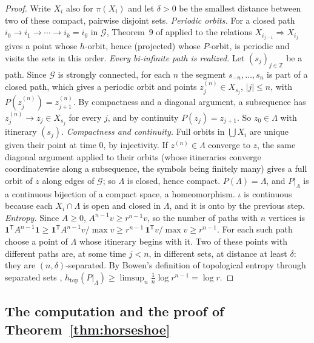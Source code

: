 \documentclass[11pt]{article}
\theoremstyle{definition}
\newcommand{\Z}{\mathbb{Z}}
\newcommand{\htop}{h_{\mathrm{top}}}
\begin{document}
\begin{proof}
Write $X_i$ also for $\pi(X_i)$ and let $\delta > 0$ be the smallest distance between two of these compact, pairwise disjoint sets. \emph{Periodic orbits.} For a closed path $i_0 \to i_1 \to \cdots \to i_k = i_0$ in $\mathcal G$, Theorem~9 of \cite{zg2004} applied to the relations $X_{i_{j-1}} \Rightarrow X_{i_j}$ gives a point whose $h$-orbit, hence (projected) whose $P$-orbit, is periodic and visits the sets in this order. \emph{Every bi-infinite path is realized.} Let $(s_j)_{j \in \Z}$ be a path. Since $\mathcal G$ is strongly connected, for each $n$ the segment $s_{-n}, \ldots, s_n$ is part of a closed path, which gives a periodic orbit and points $z^{(n)}_j \in X_{s_j}$, $|j| \le n$, with $P(z^{(n)}_j) = z^{(n)}_{j+1}$. By compactness and a diagonal argument, a subsequence has $z^{(n)}_j \to z_j \in X_{s_j}$ for every $j$, and by continuity $P(z_j) = z_{j+1}$. So $z_0 \in \Lambda$ with itinerary $(s_j)$. \emph{Compactness and continuity.} Full orbits in $\bigcup X_i$ are unique given their point at time $0$, by injectivity. If $z^{(n)} \in \Lambda$ converge to $z$, the same diagonal argument applied to their orbits (whose itineraries converge coordinatewise along a subsequence, the symbols being finitely many) gives a full orbit of $z$ along edges of $\mathcal G$; so $\Lambda$ is closed, hence compact. $P(\Lambda) = \Lambda$, and $P|_\Lambda$ is a continuous bijection of a compact space, a homeomorphism. $\iota$ is continuous because each $X_i \cap \Lambda$ is open and closed in $\Lambda$, and it is onto by the previous step. \emph{Entropy.} Since $A \ge 0$, $A^{n-1}v \ge r^{n-1}v$, so the number of paths with $n$ vertices is $\mathbf 1^{\mathsf T}A^{n-1}\mathbf 1 \ge \mathbf 1^{\mathsf T}A^{n-1}v/\max v \ge r^{n-1}\,\mathbf 1^{\mathsf T}v/\max v \ge r^{n-1}$. For each such path choose a point of $\Lambda$ whose itinerary begins with it. Two of these points with different paths are, at some time $j < n$, in different sets, at distance at least $\delta$: they are $(n, \delta)$-separated. By Bowen's definition of topological entropy through separated sets \cite[Sect.~7.2]{walters1982}, $\htop(P|_\Lambda) \ge \limsup_n \frac1n\log r^{n-1} = \log r$.
\end{proof}

\subsection{The computation and the proof of Theorem~\ref{thm:horseshoe}}
\end{document}
